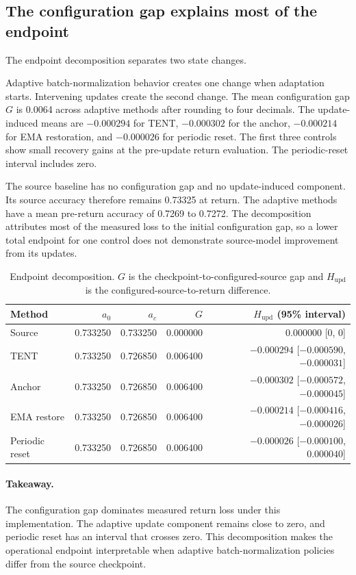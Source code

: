 \documentclass[11pt]{article}
\newcommand{\Hupd}{\ensuremath{H_{\mathrm{upd}}}}
\begin{document}
\subsection{The configuration gap explains most of the endpoint}
\label{sec:decomposition}

The endpoint decomposition separates two state changes.

Adaptive batch-normalization behavior creates one change when adaptation starts. Intervening updates create the second change.
The mean configuration gap $G$ is 0.0064 across adaptive methods after rounding to four decimals. The update-induced means are $-0.000294$ for TENT, $-0.000302$ for the anchor, $-0.000214$ for EMA restoration, and $-0.000026$ for periodic reset. The first three controls show small recovery gains at the pre-update return evaluation. The periodic-reset interval includes zero.

 The source baseline has no configuration gap and no update-induced component. Its source accuracy therefore remains 0.73325 at return. The adaptive methods have a mean pre-return accuracy of 0.7269 to 0.7272. The decomposition attributes most of the measured loss to the initial configuration gap, so a lower total endpoint for one control does not demonstrate source-model improvement from its updates.

\begin{table}[t]
\centering
\scriptsize
\caption{Endpoint decomposition. $G$ is the checkpoint-to-configured-source gap and $\Hupd$ is the configured-source-to-return difference.}
\label{tab:decomposition}
\begin{tabular}{lrrrr}
\toprule
Method & $a_0$ & $a_c$ & $G$ & $\Hupd$ (95\% interval) \\
\midrule
Source & 0.733250 & 0.733250 & 0.000000 & 0.000000 [0, 0] \\
TENT & 0.733250 & 0.726850 & 0.006400 & $-0.000294$ [$-0.000590$, $-0.000031$] \\
Anchor & 0.733250 & 0.726850 & 0.006400 & $-0.000302$ [$-0.000572$, $-0.000045$] \\
EMA restore & 0.733250 & 0.726850 & 0.006400 & $-0.000214$ [$-0.000416$, $-0.000026$] \\
Periodic reset & 0.733250 & 0.726850 & 0.006400 & $-0.000026$ [$-0.000100$, $0.000040$] \\
\bottomrule
\end{tabular}
\end{table}

\paragraph{Takeaway.}
 The configuration gap dominates measured return loss under this implementation. The adaptive update component remains close to zero, and periodic reset has an interval that crosses zero. This decomposition makes the operational endpoint interpretable when adaptive batch-normalization policies differ from the source checkpoint.
\end{document}
